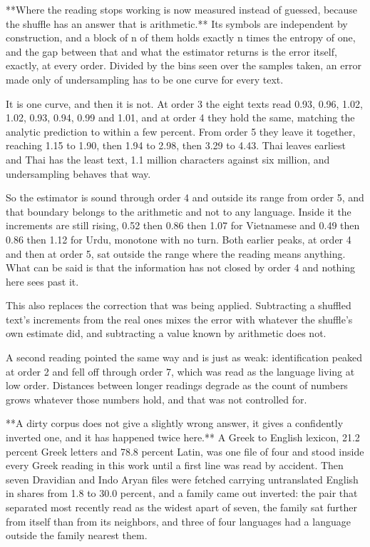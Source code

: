 **Where the reading stops working is now measured instead of guessed, because the shuffle has an answer that is arithmetic.** Its symbols are independent by construction, and a block of n of them holds exactly n times the entropy of one, and the gap between that and what the estimator returns is the error itself, exactly, at every order. Divided by the bins seen over the samples taken, an error made only of undersampling has to be one curve for every text.

It is one curve, and then it is not. At order 3 the eight texts read 0.93, 0.96, 1.02, 1.02, 0.93, 0.94, 0.99 and 1.01, and at order 4 they hold the same, matching the analytic prediction to within a few percent. From order 5 they leave it together, reaching 1.15 to 1.90, then 1.94 to 2.98, then 3.29 to 4.43. Thai leaves earliest and Thai has the least text, 1.1 million characters against six million, and undersampling behaves that way.

So the estimator is sound through order 4 and outside its range from order 5, and that boundary belongs to the arithmetic and not to any language. Inside it the increments are still rising, 0.52 then 0.86 then 1.07 for Vietnamese and 0.49 then 0.86 then 1.12 for Urdu, monotone with no turn. Both earlier peaks, at order 4 and then at order 5, sat outside the range where the reading means anything. What can be said is that the information has not closed by order 4 and nothing here sees past it.

This also replaces the correction that was being applied. Subtracting a shuffled text's increments from the real ones mixes the error with whatever the shuffle's own estimate did, and subtracting a value known by arithmetic does not.

A second reading pointed the same way and is just as weak: identification peaked at order 2 and fell off through order 7, which was read as the language living at low order. Distances between longer readings degrade as the count of numbers grows whatever those numbers hold, and that was not controlled for.

**A dirty corpus does not give a slightly wrong answer, it gives a confidently inverted one, and it has happened twice here.** A Greek to English lexicon, 21.2 percent Greek letters and 78.8 percent Latin, was one file of four and stood inside every Greek reading in this work until a first line was read by accident. Then seven Dravidian and Indo Aryan files were fetched carrying untranslated English in shares from 1.8 to 30.0 percent, and a family came out inverted: the pair that separated most recently read as the widest apart of seven, the family sat further from itself than from its neighbors, and three of four languages had a language outside the family nearest them.

